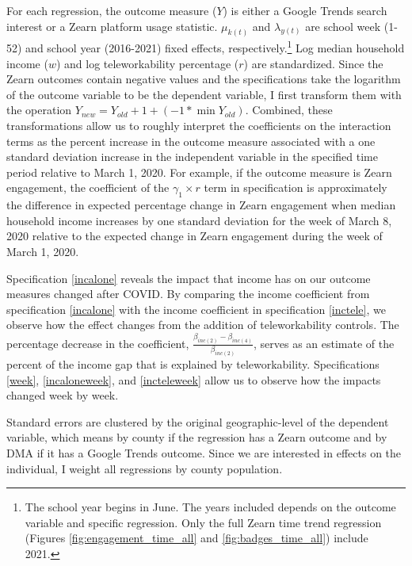 For each regression, the outcome measure ($Y$) is either a Google Trends search interest or a Zearn platform usage statistic.
$\mu_{k(t)}$ and $\lambda_{y(t)}$ are school week (1-52) and school year (2016-2021) fixed effects, respectively.\footnote{The school year begins in June. The years included depends on the outcome variable and specific regression. Only the full Zearn time trend regression (Figures \ref{fig:engagement_time_all} and \ref{fig:badges_time_all}) include 2021.}
Log median household income ($w$) and log teleworkability percentage ($r$) are standardized.
Since the Zearn outcomes contain negative values and the specifications take the logarithm of the outcome variable to be the dependent variable, I first transform them with the operation $Y_{new}=Y_{old}+1+(-1\ast\min{Y_{old}})$.
Combined, these transformations allow us to roughly interpret the coefficients on the interaction terms as the percent increase in the outcome measure associated with a one standard deviation increase in the independent variable in the specified time period relative to March 1, 2020.
For example, if the outcome measure is Zearn engagement, the coefficient of the $\gamma_1\times r$ term in specification  is approximately the difference in expected percentage change in Zearn engagement when median household income increases by one standard deviation for the week of March 8, 2020 relative to the expected change in Zearn engagement during the week of March 1, 2020.
\par
Specification \ref{incalone} reveals the impact that income has on our outcome measures changed after COVID.
By comparing the income coefficient from specification \ref{incalone} with the income coefficient in specification \ref{inctele}, we observe how the effect changes from the addition of teleworkability controls.
The percentage decrease in the coefficient, $\frac{\beta_{inc\left(2\right)}-\beta_{inc\left(4\right)}}{\beta_{inc\left(2\right)}}$, serves as an estimate of the percent of the income gap that is explained by teleworkability. Specifications \ref{week}, \ref{incaloneweek}, and \ref{incteleweek} allow us to observe how the impacts changed week by week.  \par
Standard errors are clustered by the original geographic-level of the dependent variable, which means by county if the regression has a Zearn outcome and by DMA if it has a Google Trends outcome.
Since we are interested in effects on the individual, I weight all regressions by county population.
